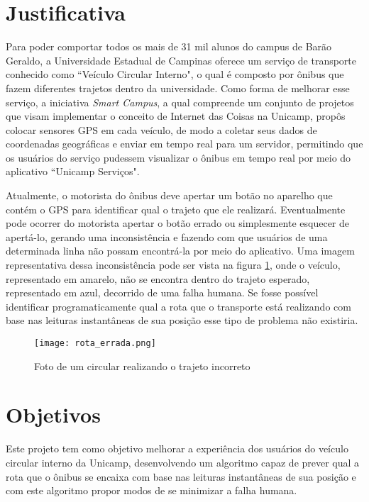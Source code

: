 \documentclass[11pt,twoside]{article}
\begin{document}
\section{Justificativa}

Para poder comportar todos os mais de 31 mil alunos do campus de Barão Geraldo, a Universidade Estadual de Campinas oferece um serviço de transporte conhecido como ``Veículo Circular Interno", o qual é composto por ônibus que fazem diferentes trajetos dentro da universidade. Como forma de melhorar esse serviço, a iniciativa \emph{Smart Campus}, a qual compreende um conjunto de projetos que visam implementar o conceito de Internet das Coisas na Unicamp, propôs colocar sensores GPS em cada veículo, de modo a coletar seus dados de coordenadas geográficas e enviar em tempo real para um servidor, permitindo que os usuários do serviço pudessem visualizar o ônibus em tempo real por meio do aplicativo ``Unicamp Serviços". 

Atualmente, o motorista do ônibus deve apertar um botão no aparelho que contém o GPS para identificar qual o trajeto que ele realizará. Eventualmente pode ocorrer do motorista apertar o botão errado ou simplesmente esquecer de apertá-lo, gerando uma inconsistência e fazendo com que usuários de uma determinada linha não possam encontrá-la por meio do aplicativo. Uma imagem representativa dessa inconsistência pode ser vista na figura \ref{fig:rota-errada}, onde o veículo, representado em amarelo, não se encontra dentro do trajeto esperado, representado em azul, decorrido de uma falha humana. Se fosse possível identificar programaticamente qual a rota que o transporte está realizando com base nas leituras instantâneas de sua posição esse tipo de problema não existiria.

\begin{figure}
  \centering
  \texttt{[image: rota\_errada.png]}
  \caption{Foto de um circular realizando o trajeto incorreto}
  \label{fig:rota-errada}
\end{figure}

\section{Objetivos}

Este projeto tem como objetivo melhorar a experiência dos usuários do veículo circular interno da Unicamp, desenvolvendo um algoritmo capaz de prever qual a rota que o ônibus se encaixa com base nas leituras instantâneas de sua posição e com este algoritmo propor modos de se minimizar a falha humana.
\end{document}
